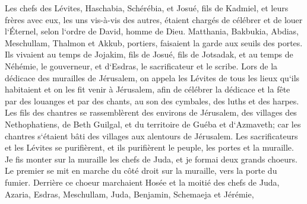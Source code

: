 \verse Les chefs des Lévites, Haschabia, Schérébia, et Josué, fils de Kadmiel, et leurs frères avec eux, les uns vis-à-vis des autres, étaient chargés de célébrer et de louer l`Éternel, selon l`ordre de David, homme de Dieu. 
\verse Matthania, Bakbukia, Abdias, Meschullam, Thalmon et Akkub, portiers, faisaient la garde aux seuils des portes. 
\verse Ils vivaient au temps de Jojakim, fils de Josué, fils de Jotsadak, et au temps de Néhémie, le gouverneur, et d`Esdras, le sacrificateur et le scribe. 
\verse Lors de la dédicace des murailles de Jérusalem, on appela les Lévites de tous les lieux qu`ils habitaient et on les fit venir à Jérusalem, afin de célébrer la dédicace et la fête par des louanges et par des chants, au son des cymbales, des luths et des harpes. 
\verse Les fils des chantres se rassemblèrent des environs de Jérusalem, des villages des Nethophatiens, 
\verse de Beth Guilgal, et du territoire de Guéba et d`Azmaveth; car les chantres s`étaient bâti des villages aux alentours de Jérusalem. 
\verse Les sacrificateurs et les Lévites se purifièrent, et ils purifièrent le peuple, les portes et la muraille. 
\verse Je fis monter sur la muraille les chefs de Juda, et je formai deux grands choeurs. Le premier se mit en marche du côté droit sur la muraille, vers la porte du fumier. 
\verse Derrière ce choeur marchaient Hosée et la moitié des chefs de Juda, 
\verse Azaria, Esdras, Meschullam, 
\verse Juda, Benjamin, Schemaeja et Jérémie, 
